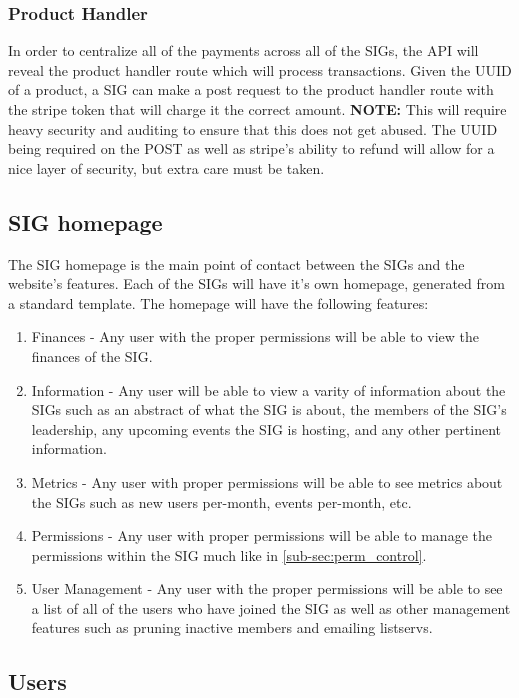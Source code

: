 \documentclass{article}
\begin{document}
\subsubsection{Product Handler}
In order to centralize all of the payments across all of the SIGs, the API will
reveal the product handler route which will process transactions. Given the UUID
of a product, a SIG can make a post request to the product handler route with the
stripe token that will charge it the correct amount. \textbf{NOTE:} This will
require heavy security and auditing to ensure that this does not get abused.
The UUID being required on the POST as well as stripe's ability to refund will 
allow for a nice layer of security, but extra care must be taken.

\subsection{SIG homepage}
The SIG homepage is the main point of contact between the SIGs and the website's
features. Each of the SIGs will have it's own homepage, generated from a standard
template. The homepage will have the following features:
\begin{enumerate}
    \item Finances - Any user with the proper permissions will be able to view
          the finances of the SIG.
    \item Information - Any user will be able to view a varity of information
          about the SIGs such as an abstract of what the SIG is about, the members
          of the SIG's leadership, any upcoming events the SIG is hosting, and any
          other pertinent information.
    \item Metrics - Any user with proper permissions will be able to see metrics
          about the SIGs such as new users per-month, events per-month, etc.
    \item Permissions - Any user with proper permissions will be able to manage
          the permissions within the SIG much like in \ref{sub-sec:perm_control}.
    \item User Management - Any user with the proper permissions will be able
          to see a list of all of the users who have joined the SIG as well as
          other management features such as pruning inactive members and 
          emailing listservs.
\end{enumerate}

\subsection{Users}
\end{document}
